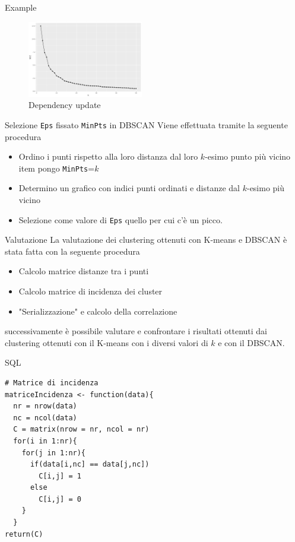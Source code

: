 \documentclass{beamer}
\begin{document}
\begin{frame}{Example}
    \begin{figure}[bt]
      \begin{center}
      \includegraphics[width = 0.45\textwidth]{../img/k-sse-voto_medio-test.png}
      \caption{Dependency update}
      \end{center}
    \end{figure}
\end{frame}

\begin{frame}{Selezione \texttt{Eps} fissato \texttt{MinPts} in DBSCAN} 
    Viene effettuata tramite la seguente procedura
    \begin{itemize}
      \item Ordino i punti rispetto alla loro distanza dal loro $k$-esimo punto più vicino
      item pongo \texttt{MinPts}=$k$
      \item Determino un grafico con indici punti ordinati e distanze dal $k$-esimo più vicino 
      \item Selezione come valore di \texttt{Eps} quello per cui c'è un picco.
    \end{itemize} 
\end{frame}

\begin{frame}{Valutazione} 
    La valutazione dei clustering ottenuti con K-means e DBSCAN è stata fatta con la seguente procedura
    \begin{itemize}
      \item Calcolo matrice distanze tra i punti
      \item Calcolo matrice di incidenza dei cluster
      \item "Serializzazione" e calcolo della correlazione
    \end{itemize} 
    successivamente è possibile valutare e confrontare i risultati ottenuti dai clustering ottenuti
    con il K-means con i diversi valori di $k$ e con il DBSCAN.
\end{frame}

\begin{frame}[fragile]{SQL}
\begin{lstlisting}[style = R]
# Matrice di incidenza
matriceIncidenza <- function(data){
  nr = nrow(data)
  nc = ncol(data)
  C = matrix(nrow = nr, ncol = nr)
  for(i in 1:nr){
    for(j in 1:nr){
      if(data[i,nc] == data[j,nc])
        C[i,j] = 1
      else
        C[i,j] = 0
    }
  }
return(C)
\end{lstlisting}
\end{frame}
\end{document}
